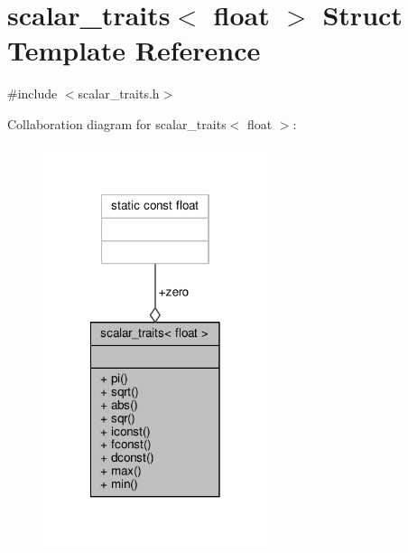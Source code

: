 \hypertarget{structscalar__traits_3_01float_01_4}{\section{scalar\-\_\-traits$<$ float $>$ Struct Template Reference}
\label{structscalar__traits_3_01float_01_4}
}


{\ttfamily \#include $<$scalar\-\_\-traits.\-h$>$}



Collaboration diagram for scalar\-\_\-traits$<$ float $>$\-:\nopagebreak
\begin{figure}[H]
\begin{center}
\leavevmode
\includegraphics[width=186pt]{structscalar__traits_3_01float_01_4__coll__graph}
\end{center}
\end{figure}
